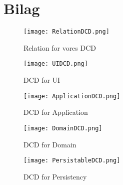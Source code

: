 \section{Bilag}

\begin{figure}[h]
    \caption{Relation for vores DCD}
    \centering
        \texttt{[image: RelationDCD.png]}
    \label{bilag:RelationDCD}
\end{figure}

\begin{sidewaysfigure}[h]
    \caption{DCD for UI}
    \centering
        \texttt{[image: UIDCD.png]}
    \label{bilag:UIDCD}
\end{sidewaysfigure}


\begin{sidewaysfigure}[h]
    \caption{DCD for Application}
    \centering
        \texttt{[image: ApplicationDCD.png]}
    \label{bilag:ApplicationDCD}
\end{sidewaysfigure}


\begin{figure}[h]
    \caption{DCD for Domain}
    \centering
        \texttt{[image: DomainDCD.png]}
    \label{bilag:DomainDCD}
\end{figure}

\begin{figure}[h]
    \caption{DCD for Persistency}
    \centering
        \texttt{[image: PersistableDCD.png]}
    \label{bilag:PersistableDCD}
\end{figure}